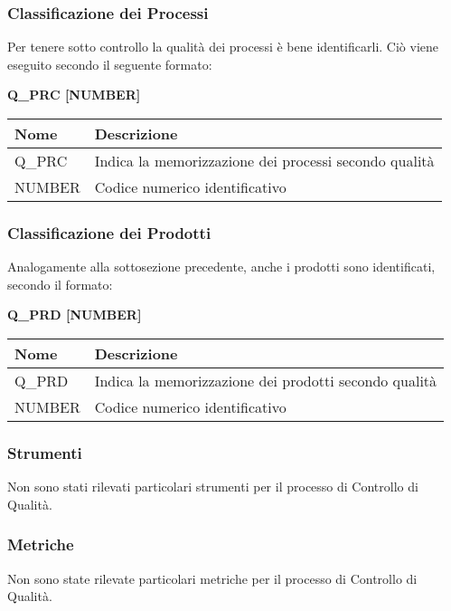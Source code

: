 \subsubsection{Classificazione dei Processi}
Per tenere sotto controllo la qualità dei processi è bene identificarli. 
Ciò viene eseguito secondo il seguente formato:
\begin{center}
    \textbf{Q\_PRC [NUMBER]}
\end{center} 
\renewcommand{\arraystretch}{1.8} %
    \begin{tabular}{ |m{7em}|m{30em}| }
        \hline
        \textbf{Nome} & \textbf{Descrizione} \\
        \hline
            Q\_PRC & Indica la memorizzazione dei processi secondo qualità \\
        \hline
            NUMBER & Codice numerico identificativo \\
        \hline
    \end{tabular}
\subsubsection{Classificazione dei Prodotti}
Analogamente alla sottosezione precedente, anche i prodotti sono identificati, secondo il formato:
\begin{center}
    \textbf{Q\_PRD [NUMBER]}
\end{center}
\renewcommand{\arraystretch}{1.8} %
    \begin{tabular}{ |m{7em}|m{30em}| }
        \hline
        \textbf{Nome} & \textbf{Descrizione} \\
        \hline
            Q\_PRD & Indica la memorizzazione dei prodotti secondo qualità \\
        \hline
            NUMBER & Codice numerico identificativo \\
        \hline
    \end{tabular}

    \subsubsection{Strumenti}
    Non sono stati rilevati particolari strumenti per il processo di Controllo di Qualità.
    \subsubsection{Metriche} 
    Non sono state rilevate particolari metriche per il processo di Controllo di Qualità.